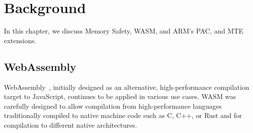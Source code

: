 \chapter{Background}
\label{ch:background}

In this chapter, we discuss Memory Safety, \ac{WASM}, and ARM's \ac{PAC}, and \ac{MTE} extensions.

\section{WebAssembly}
\label{sec:wasm}

WebAssembly~\cite{haas2017bringing}, initially designed as an alternative, high-performance compilation target to JavaScript, continues to be applied in various use cases.
\Ac{WASM} was carefully designed to allow compilation from high-performance languages traditionally compiled to native machine code such as C, C++, or Rust and for compilation to different native architectures.
